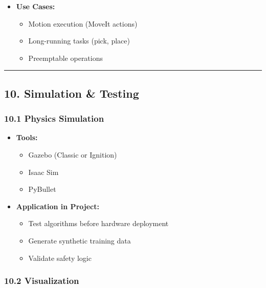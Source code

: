 \documentclass[
]{article}
\providecommand{\tightlist}{%
  \setlength{\itemsep}{0pt}\setlength{\parskip}{0pt}}
\begin{document}
\begin{itemize}
\tightlist
\item
  \textbf{Use Cases:}

  \begin{itemize}
  \tightlist
  \item
    Motion execution (MoveIt actions)
  \item
    Long-running tasks (pick, place)
  \item
    Preemptable operations
  \end{itemize}
\end{itemize}

\begin{center}\rule{0.5\linewidth}{0.5pt}\end{center}

\hypertarget{simulation-testing}{%
\subsection{10. Simulation \& Testing}\label{simulation-testing}}

\hypertarget{physics-simulation}{%
\subsubsection{10.1 Physics Simulation}\label{physics-simulation}}

\begin{itemize}
\tightlist
\item
  \textbf{Tools:}

  \begin{itemize}
  \tightlist
  \item
    Gazebo (Classic or Ignition)
  \item
    Isaac Sim
  \item
    PyBullet
  \end{itemize}
\item
  \textbf{Application in Project:}

  \begin{itemize}
  \tightlist
  \item
    Test algorithms before hardware deployment
  \item
    Generate synthetic training data
  \item
    Validate safety logic
  \end{itemize}
\end{itemize}

\hypertarget{visualization}{%
\subsubsection{10.2 Visualization}\label{visualization}}
\end{document}

